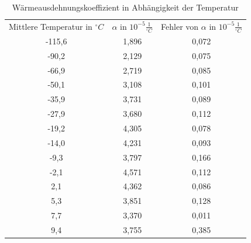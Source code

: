 \begin{table}
\begin{tabular}{|c|c|c|}

Mittlere Temperatur in $^{\circ}C$ &$ \alpha $ in $ 10^{-5}\frac {1}{^{\circ}C} $	&Fehler von $ \alpha $ in $ 10^{-5} \frac{1}{^{\circ}C}  $ \\

-115,6&				1,896	&		0,072\\

-90,2	&			2,129	&		0,075\\

-66,9	&			2,719	&		0,085\\

-50,1	&			3,108	&		0,101\\

-35,9	&			3,731	&		0,089\\

-27,9	&			3,680	&		0,112\\

-19,2	&			4,305	&		0,078\\

-14,0	&			4,231	&		0,093\\

-9,3	&			3,797	&		0,166\\

-2,1	&			4,571	&		0,112\\

2,1		&		4,362		&	0,086\\

5,3		&		3,851		&	0,128\\

7,7		&		3,370		&	0,011\\

9,4		&		3,755		&	0,385\\

\end{tabular}
\label{tbl_4}
\caption{Wärmeausdehnungskoeffizient in Abhängigkeit der Temperatur}
\end{table}

